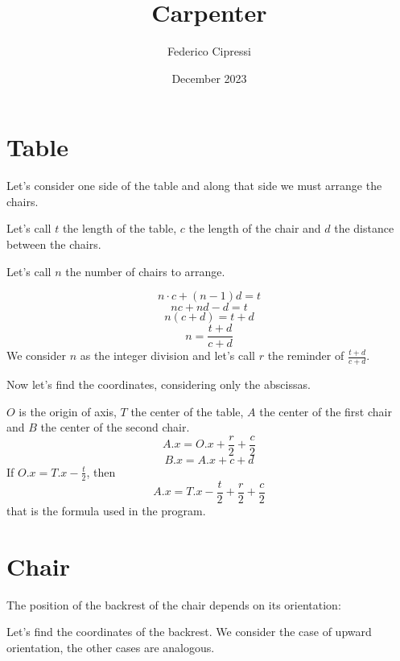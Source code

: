 \documentclass{article}
\title{Carpenter}
\author{Federico Cipressi}
\date{December 2023}
\begin{document}
\maketitle

\section{Table}
Let's consider one side of the table and along that side we must arrange the chairs.

Let's call $t$ the length of the table, $c$ the length of the chair and $d$ the distance between the chairs.

\begin{figure}[H]
    \centering
    
\end{figure}

Let's call $n$ the number of chairs to arrange.

\begin{figure}[H]
    \centering
    
\end{figure}

$$n \cdot c + (n -1)d = t$$
$$nc + nd - d = t$$
$$n(c + d) = t + d$$
$$n = \frac{t + d}{c + d}$$
We consider $n$ as the integer division and let's call $r$ the reminder of $\frac{t + d}{c + d}$.

Now let's find the coordinates, considering only the abscissas.

\begin{figure}[H]
    \centering
    
\end{figure}

$O$ is the origin of axis, $T$ the center of the table, $A$ the center of the first chair and $B$ the center of the second chair.
$$A.x = O.x + \frac{r}{2} + \frac{c}{2}$$
$$B.x = A.x + c + d$$
If $O.x = T.x - \frac{t}{2}$, then
$$A.x = T.x - \frac{t}{2} + \frac{r}{2} + \frac{c}{2}$$
that is the formula used in the program.

\section{Chair}
The position of the backrest of the chair depends on its orientation:

\begin{figure}[H]
    \centering
    
\end{figure}

Let's find the coordinates of the backrest. We consider the case of upward orientation, the other cases are analogous.
\end{document}
